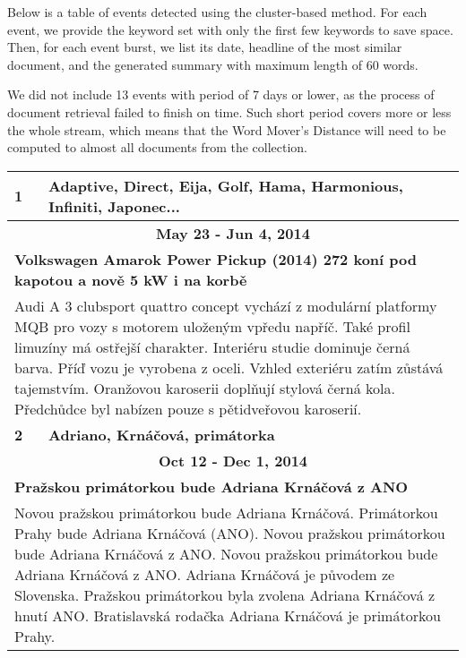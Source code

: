 Below is a table of events detected using the cluster-based method. For each event, we provide the keyword set with only the first few keywords to save space. Then, for each event burst, we list its date, headline of the most similar document, and the generated summary with maximum length of 60 words.

We did not include 13 events with period of 7 days or lower, as the process of document retrieval failed to finish on time. Such short period covers more or less the whole stream, which means that the Word Mover's Distance will need to be computed to almost all documents from the collection.


\begin{tabularx}{\linewidth}{l l} \toprule[1.5pt]


            \bf 1 & \bf Adaptive, Direct, Eija, Golf, Hama, Harmonious, Infiniti, Japonec... \\ \midrule
            
                \multicolumn{2}{c}{\bf May 23 - Jun 4, 2014} \\
                \multicolumn{2}{p{\linewidth}}{\bf Volkswagen Amarok Power Pickup (2014) 272 koní pod kapotou a nově 5 kW i na korbě} \\
                \multicolumn{2}{p{\linewidth}}{Audi A 3 clubsport quattro concept vychází z modulární platformy MQB pro vozy s motorem uloženým vpředu napříč. Také profil limuzíny má ostřejší charakter. Interiéru studie dominuje černá barva. Příď vozu je vyrobena z oceli. Vzhled exteriéru zatím zůstává tajemstvím. Oranžovou karoserii doplňují stylová černá kola. Předchůdce byl nabízen pouze s pětidveřovou karoserií.} \\ \midrule
                [1.5pt]

            \bf 2 & \bf Adriano, Krnáčová, primátorka \\ \midrule
            
                \multicolumn{2}{c}{\bf Oct 12 - Dec 1, 2014} \\
                \multicolumn{2}{p{\linewidth}}{\bf Pražskou primátorkou bude Adriana Krnáčová z ANO} \\
                \multicolumn{2}{p{\linewidth}}{Novou pražskou primátorkou bude Adriana Krnáčová. Primátorkou Prahy bude Adriana Krnáčová (ANO). Novou pražskou primátorkou bude Adriana Krnáčová z ANO. Novou pražskou primátorkou bude Adriana Krnáčová z ANO. Adriana Krnáčová je původem ze Slovenska. Pražskou primátorkou byla zvolena Adriana Krnáčová z hnutí ANO. Bratislavská rodačka Adriana Krnáčová je primátorkou Prahy.} \\ \midrule
                [1.5pt]


\end{tabularx}
